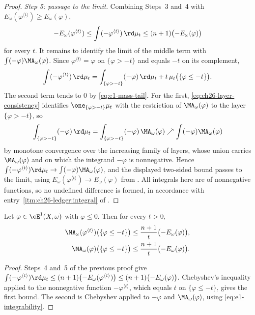 \begin{proof}
\emph{Step 5: passage to the limit.}  Combining Steps~3 and~4 with
$E_\omega(\varphi^{\langle t\rangle})\geq E_\omega(\varphi)$,
\[
 -E_\omega(\varphi^{\langle t\rangle})
 \leq\int(-\varphi^{\langle t\rangle})\,\rd\mu_t
 \leq(n+1)\bigl(-E_\omega(\varphi)\bigr)
\]
for every $t$.  It remains to identify the limit of the middle term with
$\int(-\varphi)\MA_\omega(\varphi)$.  Since
$\varphi^{\langle t\rangle}=\varphi$ on $\{\varphi>-t\}$ and equals
$-t$ on its complement,
\begin{equation}
\label{eq:ch26-tail-split}
 \int(-\varphi^{\langle t\rangle})\,\rd\mu_t
 =\int_{\{\varphi>-t\}}(-\varphi)\,\rd\mu_t
  +t\,\mu_t\bigl(\{\varphi\leq-t\}\bigr).
\end{equation}
The second term tends to $0$ by \eqref{eq:e1-mass-tail}.  For the first,
\eqref{eq:ch26-layer-consistency} identifies $\one_{\{\varphi>-t\}}\mu_t$
with the restriction of $\MA_\omega(\varphi)$ to the layer
$\{\varphi>-t\}$, so
\[
 \int_{\{\varphi>-t\}}(-\varphi)\,\rd\mu_t
 =\int_{\{\varphi>-t\}}(-\varphi)\,\MA_\omega(\varphi)
 \nearrow\int(-\varphi)\MA_\omega(\varphi)
\]
by monotone convergence over the increasing family of layers, whose union
carries $\MA_\omega(\varphi)$ and on which the integrand $-\varphi$ is
nonnegative.  Hence
$\int(-\varphi^{\langle t\rangle})\rd\mu_t\to
\int(-\varphi)\MA_\omega(\varphi)$, and the displayed two-sided bound passes
to the limit, using $E_\omega(\varphi^{\langle t\rangle})\to
E_\omega(\varphi)$ from .  All integrals
here are of nonnegative functions, so no undefined difference is formed, in
accordance with entry~\cref{itm:ch26-ledger:integral} of
.
\end{proof}

\begin{corollary}
\label{cor:ch26-quantitative-tail}
Let $\varphi\in\cE^1(X,\omega)$ with $\varphi\leq0$.  Then for every
$t>0$,
\begin{equation}
\label{eq:ch26-quantitative-tail}
 \begin{aligned}
 \MA_\omega(\varphi^{\langle t\rangle})
   \bigl(\{\varphi\leq-t\}\bigr)
 &\leq\frac{n+1}{t}\bigl(-E_\omega(\varphi)\bigr),\\
 \MA_\omega(\varphi)\bigl(\{\varphi\leq-t\}\bigr)
 &\leq\frac{n+1}{t}\bigl(-E_\omega(\varphi)\bigr).
 \end{aligned}
\end{equation}
\end{corollary}

\begin{proof}
Steps~4 and~5 of the previous proof give
$\int(-\varphi^{\langle t\rangle})\rd\mu_t\leq
(n+1)\bigl(-E_\omega(\varphi^{\langle t\rangle})\bigr)
\leq(n+1)\bigl(-E_\omega(\varphi)\bigr)$.
Chebyshev's inequality applied to the nonnegative function
$-\varphi^{\langle t\rangle}$, which equals $t$ on
$\{\varphi\leq-t\}$, gives the first bound.  The second is Chebyshev
applied to $-\varphi$ and $\MA_\omega(\varphi)$, using
\eqref{eq:e1-integrability}.
\end{proof}


